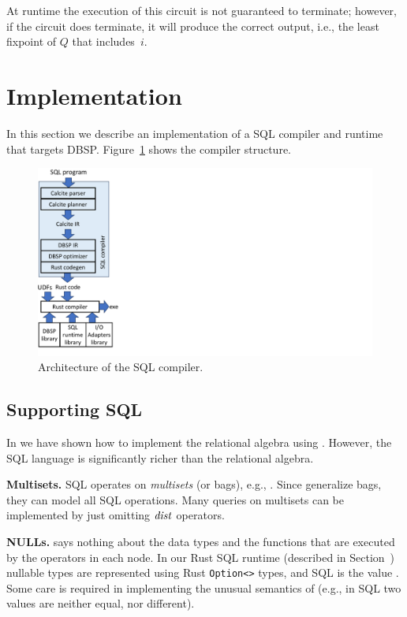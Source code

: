 At runtime the execution of this circuit is not guaranteed to terminate;
however, if the circuit does terminate, it will produce the correct
output, i.e., the least fixpoint of $Q$ that includes~$i$.

\section{Implementation}\label{sec:implementation}

In this section we describe an implementation of a SQL compiler and
runtime that targets DBSP.  Figure~\ref{fig:tools} shows the compiler
structure.

\begin{figure}[h]
  \begin{center}
    \includegraphics[trim={0 0in 10in 0},clip,scale=.45]{tools.pdf}
    \caption{\label{fig:tools}Architecture of the SQL compiler.}
  \end{center}
\end{figure}

\subsection{Supporting SQL}

In  we have shown how to implement the
relational algebra using \dbsp.  However, the SQL language is
significantly richer than the relational algebra.

\textbf{Multisets.} SQL operates on \emph{multisets} (or bags), e.g.,
.  Since \zrs generalize bags, they can model all SQL
operations. Many queries on multisets can be implemented by just
omitting $\mathit{dist}$ operators.

\textbf{NULLs.} \dbsp says nothing about the data types
and the functions that are executed by the operators in each node.  In
our Rust SQL runtime (described in Section~)
nullable types are represented using Rust \texttt{Option<>} types, and
SQL  is the value .  Some care is required in
implementing the unusual semantics of  (e.g., in SQL two
 values are neither equal, nor different).

